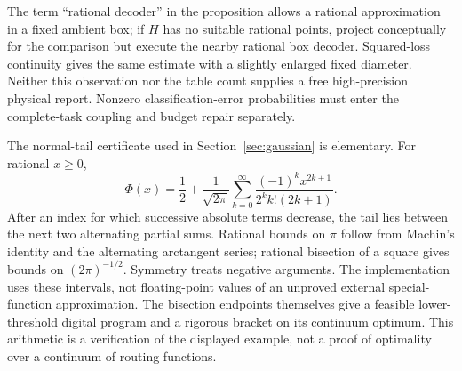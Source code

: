 The term ``rational decoder'' in the proposition allows a rational approximation in a fixed ambient box; if $H$ has no suitable rational points, project conceptually for the comparison but execute the nearby rational box decoder. Squared-loss continuity gives the same estimate with a slightly enlarged fixed diameter. Neither this observation nor the table count supplies a free high-precision physical report. Nonzero classification-error probabilities must enter the complete-task coupling and budget repair separately.

The normal-tail certificate used in Section~\ref{sec:gaussian} is elementary. For rational $x\ge0$,
\[
 \Phi(x)=\frac12+\frac1{\sqrt{2\pi}}
 \sum_{k=0}^{\infty}\frac{(-1)^k x^{2k+1}}{2^k k!(2k+1)}.
\]
After an index for which successive absolute terms decrease, the tail lies between the next two alternating partial sums. Rational bounds on $\pi$ follow from Machin's identity and the alternating arctangent series; rational bisection of a square gives bounds on $(2\pi)^{-1/2}$. Symmetry treats negative arguments. The implementation uses these intervals, not floating-point values of an unproved external special-function approximation. The bisection endpoints themselves give a feasible lower-threshold digital program and a rigorous bracket on its continuum optimum. This arithmetic is a verification of the displayed example, not a proof of optimality over a continuum of routing functions.
